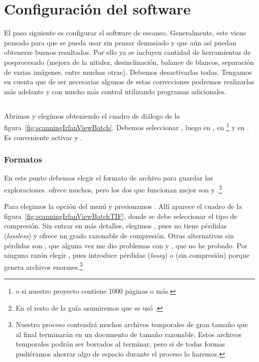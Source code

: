 \documentclass[%
	a5paper,
	10pt,
	twoside,
	openright,
	final,
]{memoir}
\begin{document}
{	\section{Configuración del software\label{sec:scanningSoftware}} El paso siguiente es configurar el software de escaneo. Generalmente, este viene pensado para que se pueda usar sin pensar demasiado y que aún así puedan obtenerse buenos resultados. Por ello ya se incluyen cantidad de herramientas de posprocesado (mejora de la nitidez, desinclinación, balance de blancos, separación de varias imágenes, entre muchas otras). Debemos desactivarlas todas. Tengamos en cuenta que de ser necesarias algunas de estas correcciones podremos realizarlas más adelante y con mucho más control utilizando programas adicionales.

	\subsection{\irfanview} Abrimos \irfanview y elegimos  obteniendo el cuadro de diálogo de la figura~\ref{fig:scanningIrfanViewBatch}. Debemos seleccionar , luego en , en \footnote{o  si nuestro proyecto contiene 1000 páginas o más.} y en . Es conveniente activar  y .

	\subsubsection{Formatos\label{sec:scanningSoftwareFormats}} En este punto debemos elegir el formato de archivo para guardar las exploraciones. \irfanview ofrece muchos, pero los dos que funcionan mejor son \tiff y \png.\footnote{En el resto de la guía asumiremos que se usó \tiff.}

	Para \tiff elegimos la opción  del menú  y presionamos . Allí aparece el cuadro de la figura~\ref{fig:scanningIrfanViewBatchTIF}, donde se debe seleccionar el tipo de compresión. Sin entrar en más detalles, elegimos , pues no tiene pérdidas (\emph{lossless}) y ofrece un grado razonable de compresión. Otras alternativas sin pérdidas son , que alguna vez me dio problemas con \scantailor y , que no he probado. Por ninguna razón elegir , pues introduce pérdidas (\emph{lossy}) o  (sin compresión) porque genera archivos enormes.\footnote{Nuestro proceso contendrá muchos archivos temporales de gran tamaño que al final terminarán en un documento de tamaño razonable. Estos archivos temporales podrán ser borrados al terminar, pero si de todas formas pudiéramos ahorrar algo de espacio durante el proceso lo haremos.}

}
\end{document}
